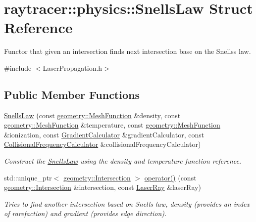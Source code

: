 \hypertarget{structraytracer_1_1physics_1_1SnellsLaw}{}\section{raytracer\+:\+:physics\+:\+:Snells\+Law Struct Reference}
\label{structraytracer_1_1physics_1_1SnellsLaw}


Functor that given an intersection finds next intersection base on the Snells\textquotesingle{}s law.  




{\ttfamily \#include $<$Laser\+Propagation.\+h$>$}

\subsection*{Public Member Functions}
\begin{DoxyCompactItemize}
\item 
\hyperlink{structraytracer_1_1physics_1_1SnellsLaw_a43fd9b6200b38980cee85d3451ef125a}{Snells\+Law} (const \hyperlink{classraytracer_1_1geometry_1_1MeshFunction}{geometry\+::\+Mesh\+Function} \&density, const \hyperlink{classraytracer_1_1geometry_1_1MeshFunction}{geometry\+::\+Mesh\+Function} \&temperature, const \hyperlink{classraytracer_1_1geometry_1_1MeshFunction}{geometry\+::\+Mesh\+Function} \&ionization, const \hyperlink{classraytracer_1_1physics_1_1GradientCalculator}{Gradient\+Calculator} \&gradient\+Calculator, const \hyperlink{classraytracer_1_1physics_1_1CollisionalFrequencyCalculator}{Collisional\+Frequency\+Calculator} \&collisional\+Frequency\+Calculator)
\begin{DoxyCompactList}\small\item\em Construct the \hyperlink{structraytracer_1_1physics_1_1SnellsLaw}{Snells\+Law} using the density and temperature function reference. \end{DoxyCompactList}\item 
std\+::unique\+\_\+ptr$<$ \hyperlink{structraytracer_1_1geometry_1_1Intersection}{geometry\+::\+Intersection} $>$ \hyperlink{structraytracer_1_1physics_1_1SnellsLaw_a7e46909c41385ab586a800dd6f8c0b28}{operator()} (const \hyperlink{structraytracer_1_1geometry_1_1Intersection}{geometry\+::\+Intersection} \&intersection, const \hyperlink{structraytracer_1_1physics_1_1LaserRay}{Laser\+Ray} \&laser\+Ray)
\begin{DoxyCompactList}\small\item\em Tries to find another intersection based on Snells law, density (provides an index of rarefaction) and gradient (provides edge direction). \end{DoxyCompactList}\end{DoxyCompactItemize}


